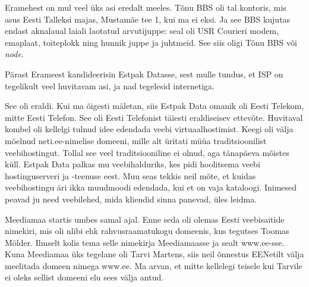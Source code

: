 
Eramehest on mul veel üks asi eredalt meeles. Tõnu BBS oli tal 
kontoris, mis asus Eesti Talleksi majas, Mustamäe tee 1, kui ma ei 
eksi. Ja see BBS kujutas endast aknalaual laiali laotatud arvutijuppe: seal 
oli USR Courieri modem, emaplaat, toiteplokk 
ning hunnik juppe ja juhtmeid. See siis oligi Tõnu BBS või \emph{node}.

Pärast Erameest kandideerisin Estpak Datasse, sest mulle 
tundus, et ISP on tegelikult veel huvitavam asi, ja nad 
tegelesid internetiga.


See oli eraldi. Kui ma õigesti mäletan, siis Estpak Data omanik oli 
Eesti Telekom, mitte Eesti Telefon. See oli Eesti Telefonist täiesti eraldiseisev ettevõte. Huvitaval kombel oli kellelgi 
tulnud idee edendada veebi 
virtuaalhostimist. Keegi oli välja mõelnud neti.ee-nimelise 
domeeni, mille alt üritati müüa traditsioonilist 
veebihostingut. Tollal see veel traditsiooniline ei olnud, aga 
tänapäeva mõistes küll. Estpak Data palkas mu veebihalduriks,
kes pidi hoolitsema veebi hostinguserveri ja -teenuse eest. Muu seas tekkis 
neil mõte, et kuidas veebihostingu äri ikka muudmoodi 
edendada, kui et on vaja kataloogi. Inimesed peavad ju 
need veebilehed, mida kliendid sinna panevad, üles leidma.


Meediamaa startis umbes samal ajal. Enne seda oli olemas 
Eesti veebisaitide nimekiri, mis oli nlibi ehk 
rahvusraamatukogu domeenis, kus tegutses Toomas 
Mölder. Ilmselt kolis tema
selle nimekirja Meediamaasse ja sealt www.ee-sse. Kuna 
Meediamaa üks tegelane oli Tarvi Martens, siis neil 
õnnestus EENetilt välja meelitada domeen nimega 
www.ee. Ma arvan, et mitte kellelegi 
teisele kui Tarvile ei oleks sellist domeeni elu sees välja antud.

